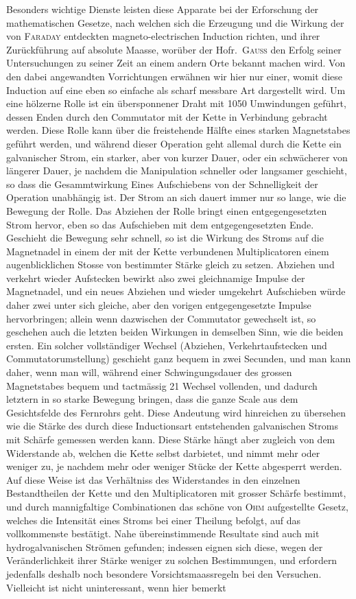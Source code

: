 Besonders wichtige Dienste leisten diese Apparate bei der Erforschung der mathematischen Gesetze, nach welchen sich die Erzeugung und die Wirkung der von \textsc{Faraday} entdeckten magneto-electrischen Induction richten, und ihrer Zurückführung auf absolute Maasse, worüber der Hofr.\ \textsc{Gauss} den Erfolg seiner Untersuchungen zu seiner Zeit an einem andern Orte bekannt machen wird. Von den dabei angewandten Vorrichtungen erwähnen wir hier nur einer, womit diese Induction auf eine eben so einfache als scharf messbare Art dargestellt wird. Um eine hölzerne Rolle ist ein übersponnener Draht mit 1050 Umwindungen geführt, dessen Enden durch den Commutator mit der Kette in Verbindung gebracht werden. Diese Rolle kann über die freistehende Hälfte eines starken Magnetstabes geführt werden, und während dieser Operation geht allemal durch die Kette ein galvanischer Strom, ein starker, aber von kurzer Dauer, oder ein schwächerer von längerer Dauer, je nachdem die Manipulation schneller oder langsamer geschieht, so dass die Gesammtwirkung Eines Aufschiebens von der Schnelligkeit der Operation unabhängig ist. Der Strom an sich dauert immer nur so lange, wie die Bewegung der Rolle. Das Abziehen der Rolle bringt einen entgegengesetzten Strom hervor, eben so das Aufschieben mit dem entgegengesetzten Ende. Geschieht die Bewegung sehr schnell, so ist die Wirkung des Stroms auf die Magnetnadel in einem der mit der Kette verbundenen Multiplicatoren einem augenblicklichen Stosse von bestimmter Stärke gleich zu setzen. Abziehen und verkehrt wieder Aufstecken bewirkt also zwei gleichnamige Impulse der Magnetnadel, und ein neues Abziehen und wieder umgekehrt Aufschieben würde daher zwei unter sich gleiche, aber den vorigen entgegengesetzte Impulse hervorbringen; allein wenn dazwischen der Commutator gewechselt ist, so geschehen auch die letzten beiden Wirkungen in demselben Sinn, wie die beiden ersten. Ein solcher vollständiger Wechsel (Abziehen, Verkehrtaufstecken und Commutatorumstellung) geschieht ganz bequem in zwei Secunden, und man kann daher, wenn man will, während einer Schwingungsdauer des grossen Magnetstabes bequem und tactmässig 21 Wechsel vollenden, und dadurch letztern in so starke Bewegung bringen, dass die ganze Scale aus dem Gesichtsfelde des Fernrohrs geht. Diese Andeutung wird hinreichen zu übersehen wie die Stärke des durch diese Inductionsart entstehenden galvanischen Stroms mit Schärfe gemessen werden kann. Diese Stärke hängt aber zugleich von dem Widerstande ab, welchen die Kette selbst darbietet, und nimmt mehr oder weniger zu, je nachdem mehr oder weniger Stücke der Kette abgesperrt werden. Auf diese Weise ist das Verhältniss des Widerstandes in den einzelnen Bestandtheilen der Kette und den Multiplicatoren mit grosser Schärfe bestimmt, und durch mannigfaltige Combinationen das schöne von \textsc{Ohm} aufgestellte Gesetz, welches die Intensität eines Stroms bei einer Theilung befolgt, auf das vollkommenste bestätigt. Nahe übereinstimmende Resultate sind auch mit hydrogalvanischen Strömen gefunden; indessen eignen sich diese, wegen der Veränderlichkeit ihrer Stärke weniger zu solchen Bestimmungen, und erfordern jedenfalls deshalb noch besondere Vorsichtsmaassregeln bei den Versuchen. Vielleicht ist nicht uninteressant, wenn hier bemerkt
